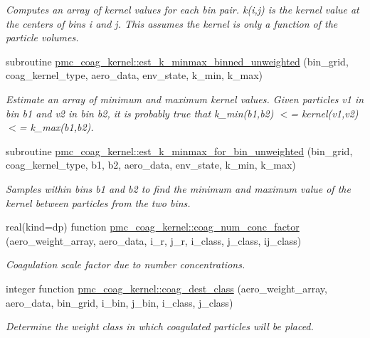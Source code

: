 \begin{DoxyCompactItemize}
\begin{DoxyCompactList}\small\item\em Computes an array of kernel values for each bin pair. k(i,j) is the kernel value at the centers of bins i and j. This assumes the kernel is only a function of the particle volumes. \end{DoxyCompactList}\item 
subroutine \mbox{\hyperlink{namespacepmc__coag__kernel_a3081c503d797de18f273fdc785e2b358}{pmc\+\_\+coag\+\_\+kernel\+::est\+\_\+k\+\_\+minmax\+\_\+binned\+\_\+unweighted}} (bin\+\_\+grid, coag\+\_\+kernel\+\_\+type, aero\+\_\+data, env\+\_\+state, k\+\_\+min, k\+\_\+max)
\begin{DoxyCompactList}\small\item\em Estimate an array of minimum and maximum kernel values. Given particles v1 in bin b1 and v2 in bin b2, it is probably true that {\ttfamily k\+\_\+min(b1,b2) $<$= kernel(v1,v2) $<$= k\+\_\+max(b1,b2)}. \end{DoxyCompactList}\item 
subroutine \mbox{\hyperlink{namespacepmc__coag__kernel_a3930ee7fd2fbb2c326683ad6b9c08185}{pmc\+\_\+coag\+\_\+kernel\+::est\+\_\+k\+\_\+minmax\+\_\+for\+\_\+bin\+\_\+unweighted}} (bin\+\_\+grid, coag\+\_\+kernel\+\_\+type, b1, b2, aero\+\_\+data, env\+\_\+state, k\+\_\+min, k\+\_\+max)
\begin{DoxyCompactList}\small\item\em Samples within bins b1 and b2 to find the minimum and maximum value of the kernel between particles from the two bins. \end{DoxyCompactList}\item 
real(kind=dp) function \mbox{\hyperlink{namespacepmc__coag__kernel_a39c314a4ab6418c6c6ff1fc12678de26}{pmc\+\_\+coag\+\_\+kernel\+::coag\+\_\+num\+\_\+conc\+\_\+factor}} (aero\+\_\+weight\+\_\+array, aero\+\_\+data, i\+\_\+r, j\+\_\+r, i\+\_\+class, j\+\_\+class, ij\+\_\+class)
\begin{DoxyCompactList}\small\item\em Coagulation scale factor due to number concentrations. \end{DoxyCompactList}\item 
integer function \mbox{\hyperlink{namespacepmc__coag__kernel_a472f1cb2e3d50f1d44c1cb3a55df568b}{pmc\+\_\+coag\+\_\+kernel\+::coag\+\_\+dest\+\_\+class}} (aero\+\_\+weight\+\_\+array, aero\+\_\+data, bin\+\_\+grid, i\+\_\+bin, j\+\_\+bin, i\+\_\+class, j\+\_\+class)
\begin{DoxyCompactList}\small\item\em Determine the weight class in which coagulated particles will be placed. \end{DoxyCompactList}\item 

\end{DoxyCompactItemize}
